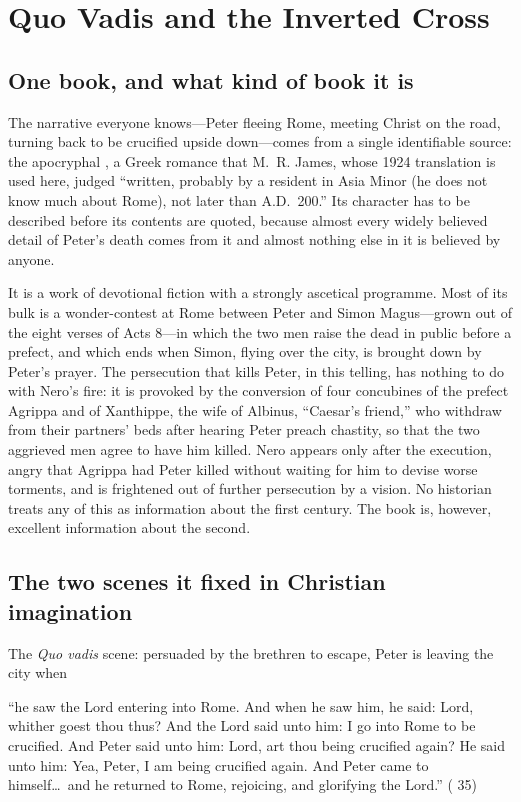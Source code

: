\section{Quo Vadis and the Inverted Cross}

\subsection{One book, and what kind of book it is}

The narrative everyone knows---Peter fleeing Rome, meeting Christ on the
road, turning back to be crucified upside down---comes from a single
identifiable source: the apocryphal , a Greek romance
that M.~R. James, whose 1924 translation is used here, judged ``written,
probably by a resident in Asia Minor (he does not know much about Rome), not
later than A.D.\ 200.'' Its character has to be described before its contents
are quoted, because almost every widely believed detail of Peter's death
comes from it and almost nothing else in it is believed by anyone.

It is a work of devotional fiction with a strongly ascetical programme. Most
of its bulk is a wonder-contest at Rome between Peter and Simon Magus---grown
out of the eight verses of Acts 8---in which the two men raise the dead in
public before a prefect, and which ends when Simon, flying over the city, is
brought down by Peter's prayer. The persecution that kills Peter, in this
telling, has nothing to do with Nero's fire: it is provoked by the conversion
of four concubines of the prefect Agrippa and of Xanthippe, the wife of
Albinus, ``Caesar's friend,'' who withdraw from their partners' beds after
hearing Peter preach chastity, so that the two aggrieved men agree to have
him killed. Nero appears only after the execution, angry that Agrippa had
Peter killed without waiting for him to devise worse torments, and is
frightened out of further persecution by a vision. No historian treats any of
this as information about the first century. The book is, however, excellent
information about the second.

\subsection{The two scenes it fixed in Christian imagination}

The \textit{Quo vadis} scene: persuaded by the brethren to escape, Peter is
leaving the city when

\begin{studyframe}\small
``he saw the Lord entering into Rome. And when he saw him, he said: Lord,
whither goest thou thus? And the Lord said unto him: I go into Rome to be
crucified. And Peter said unto him: Lord, art thou being crucified again? He
said unto him: Yea, Peter, I am being crucified again. And Peter came to
himself\ldots\ and he returned to Rome, rejoicing, and glorifying the Lord.''
( 35)
\end{studyframe}

